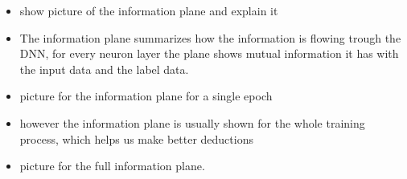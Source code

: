 \begin{itemize}
  \item{
      show picture of the information plane and explain it
    }
  \item{
      The information plane summarizes how the information is flowing trough the
      DNN, for every neuron layer the plane shows mutual information it has with
      the input data and the label data. 
    }
  \item{
      picture for the information plane for a single epoch
    }
  \item{
      however the information plane is usually shown for the whole training
      process, which helps us make better deductions 
    }
  \item{
      picture for the full information plane.
    }
\end{itemize}
